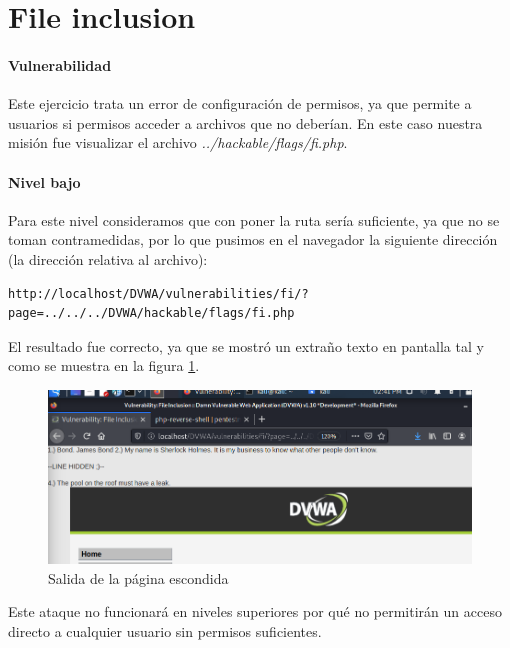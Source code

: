 \section{File inclusion}
\paragraph{Vulnerabilidad} Este ejercicio trata un error de configuración de permisos,
ya que permite a usuarios si permisos acceder a archivos que no deberían. En este caso nuestra misión fue
visualizar el archivo {\it ../hackable/flags/fi.php}.
\paragraph{Nivel bajo} Para este nivel consideramos que con poner la ruta sería suficiente, ya
que no se toman contramedidas, por lo que pusimos en el navegador la siguiente dirección (la dirección
relativa al archivo):
\begin{lstlisting}
http://localhost/DVWA/vulnerabilities/fi/?page=../../../DVWA/hackable/flags/fi.php
\end{lstlisting}
El resultado fue correcto, ya que se mostró un extraño texto en pantalla tal y como se muestra en
la figura \ref{fig:hidden}.
\begin{figure}[ht!]
    \centering
    \includegraphics[width=14cm]{img/inclusion/flags.png}
    \caption{Salida de la página escondida}
    \label{fig:hidden}
\end{figure}
Este ataque no funcionará en niveles superiores por qué no permitirán un acceso directo a 
cualquier usuario sin permisos suficientes.
